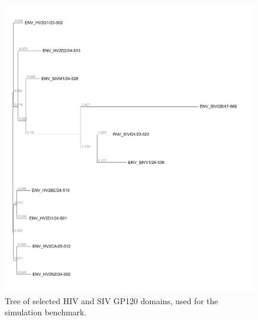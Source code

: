 \documentclass{bioinfo}
\begin{document}
\begin{figure}
  \includegraphics[width=.8\columnwidth]{gp120tree.pdf}
  \caption{
    Tree of selected HIV and SIV GP120 domains, used for the simulation benchmark.
  }
\end{figure}
\end{document}
